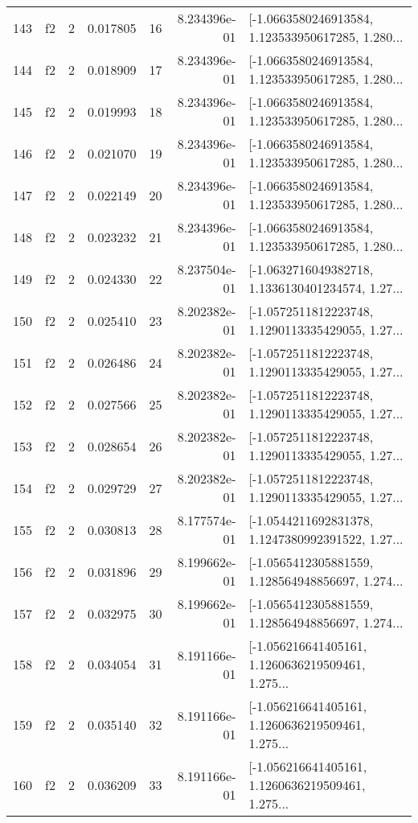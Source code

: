 \begin{tabular}{lllrlrl}
143 &  f2 &   2 &  0.017805 &   16 &  8.234396e-01 &  [-1.0663580246913584, 1.123533950617285, 1.280... \\
144 &  f2 &   2 &  0.018909 &   17 &  8.234396e-01 &  [-1.0663580246913584, 1.123533950617285, 1.280... \\
145 &  f2 &   2 &  0.019993 &   18 &  8.234396e-01 &  [-1.0663580246913584, 1.123533950617285, 1.280... \\
146 &  f2 &   2 &  0.021070 &   19 &  8.234396e-01 &  [-1.0663580246913584, 1.123533950617285, 1.280... \\
147 &  f2 &   2 &  0.022149 &   20 &  8.234396e-01 &  [-1.0663580246913584, 1.123533950617285, 1.280... \\
148 &  f2 &   2 &  0.023232 &   21 &  8.234396e-01 &  [-1.0663580246913584, 1.123533950617285, 1.280... \\
149 &  f2 &   2 &  0.024330 &   22 &  8.237504e-01 &  [-1.0632716049382718, 1.1336130401234574, 1.27... \\
150 &  f2 &   2 &  0.025410 &   23 &  8.202382e-01 &  [-1.0572511812223748, 1.1290113335429055, 1.27... \\
151 &  f2 &   2 &  0.026486 &   24 &  8.202382e-01 &  [-1.0572511812223748, 1.1290113335429055, 1.27... \\
152 &  f2 &   2 &  0.027566 &   25 &  8.202382e-01 &  [-1.0572511812223748, 1.1290113335429055, 1.27... \\
153 &  f2 &   2 &  0.028654 &   26 &  8.202382e-01 &  [-1.0572511812223748, 1.1290113335429055, 1.27... \\
154 &  f2 &   2 &  0.029729 &   27 &  8.202382e-01 &  [-1.0572511812223748, 1.1290113335429055, 1.27... \\
155 &  f2 &   2 &  0.030813 &   28 &  8.177574e-01 &  [-1.0544211692831378, 1.1247380992391522, 1.27... \\
156 &  f2 &   2 &  0.031896 &   29 &  8.199662e-01 &  [-1.0565412305881559, 1.128564948856697, 1.274... \\
157 &  f2 &   2 &  0.032975 &   30 &  8.199662e-01 &  [-1.0565412305881559, 1.128564948856697, 1.274... \\
158 &  f2 &   2 &  0.034054 &   31 &  8.191166e-01 &  [-1.056216641405161, 1.1260636219509461, 1.275... \\
159 &  f2 &   2 &  0.035140 &   32 &  8.191166e-01 &  [-1.056216641405161, 1.1260636219509461, 1.275... \\
160 &  f2 &   2 &  0.036209 &   33 &  8.191166e-01 &  [-1.056216641405161, 1.1260636219509461, 1.275... \\

\end{tabular}
